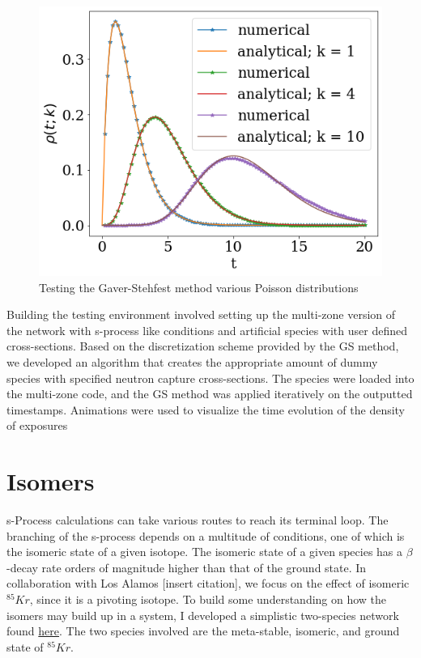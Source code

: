 \documentclass{article}
\begin{document}
\begin{figure}[!htp]
    \centerline{\includegraphics[scale = 0.5]{images/poisson_test.png}}
    \caption{Testing the Gaver-Stehfest method various Poisson distributions}
    \label{fig 3}
\end{figure}


Building the testing environment involved setting up the multi-zone version of the network with s-process like conditions and artificial 
species with user defined cross-sections. Based on the discretization scheme provided by the GS method, we developed an algorithm 
that creates the appropriate amount of dummy species with specified neutron capture cross-sections. The species were loaded into the 
multi-zone code, and the GS method was applied iteratively on the outputted timestamps. Animations were used to visualize the time 
evolution of the density of exposures 

\section*{Isomers}

s-Process calculations can take various routes to reach its terminal loop. The branching of the s-process depends on a multitude of 
conditions, one of which is the isomeric state of a given isotope. The isomeric state of a given species has a $\beta$-decay rate 
orders of magnitude higher than that of the ground state. In collaboration with Los Alamos [insert citation], we focus on the 
effect of isomeric $^{85}Kr$, since it is a pivoting isotope. To build some understanding on how the isomers may build up in a system, 
I developed a simplistic two-species network found \href{https://github.com/jaadt7/isomer_intuition}{here}.
The two species involved are the meta-stable, isomeric, and ground state of $^{85}Kr$.\\ 
\end{document}
